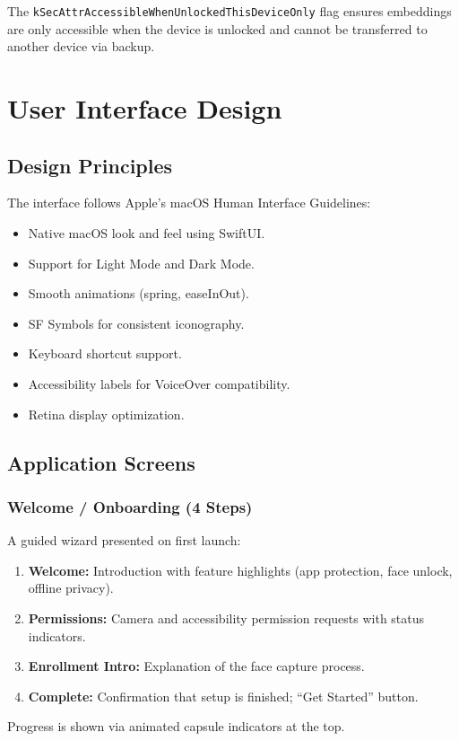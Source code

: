 \documentclass[12pt,a4paper]{report}
\begin{document}
The \texttt{kSecAttrAccessibleWhenUnlockedThisDeviceOnly} flag ensures embeddings are only accessible when the device is unlocked and cannot be transferred to another device via backup.

\chapter{User Interface Design}

\section{Design Principles}
The interface follows Apple's macOS Human Interface Guidelines:
\begin{itemize}[noitemsep]
    \item Native macOS look and feel using SwiftUI.
    \item Support for Light Mode and Dark Mode.
    \item Smooth animations (spring, easeInOut).
    \item SF Symbols for consistent iconography.
    \item Keyboard shortcut support.
    \item Accessibility labels for VoiceOver compatibility.
    \item Retina display optimization.
\end{itemize}

\section{Application Screens}

\subsection{Welcome / Onboarding (4 Steps)}
A guided wizard presented on first launch:
\begin{enumerate}[noitemsep]
    \item \textbf{Welcome:} Introduction with feature highlights (app protection, face unlock, offline privacy).
    \item \textbf{Permissions:} Camera and accessibility permission requests with status indicators.
    \item \textbf{Enrollment Intro:} Explanation of the face capture process.
    \item \textbf{Complete:} Confirmation that setup is finished; ``Get Started'' button.
\end{enumerate}
Progress is shown via animated capsule indicators at the top.
\end{document}
